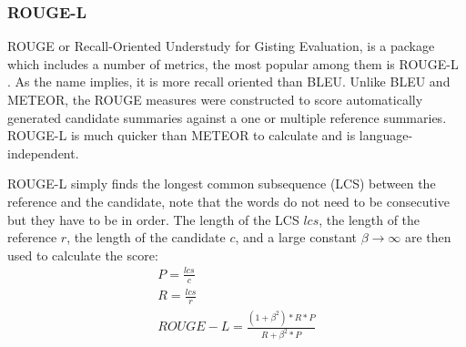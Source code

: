 \subsubsection{ROUGE-L}
ROUGE or Recall-Oriented Understudy for Gisting Evaluation, is a package which includes a number of metrics, the most popular among them is ROUGE-L \cite{Rouge}. As the name implies, it is more recall oriented than BLEU. Unlike BLEU and METEOR, the ROUGE measures were constructed to score automatically generated candidate summaries against a one or multiple reference summaries. ROUGE-L is much quicker than METEOR to calculate and is language-independent.

ROUGE-L simply finds the longest common subsequence (LCS) between the reference and the candidate, note that the words do not need to be consecutive but they have to be in order. The length of the LCS \(lcs\), the length of the reference \(r\), the length of the candidate \(c\), and a large constant \(\beta \rightarrow \infty\) are then used to calculate the score:
\begin{equation}
  \begin{aligned}
P = \frac{lcs}{c} \\
R = \frac{lcs}{r} \\
ROUGE-L= \frac{(1+\beta^2)*R*P}{R+ \beta^2 * P} \\
\end{aligned}
\end{equation}